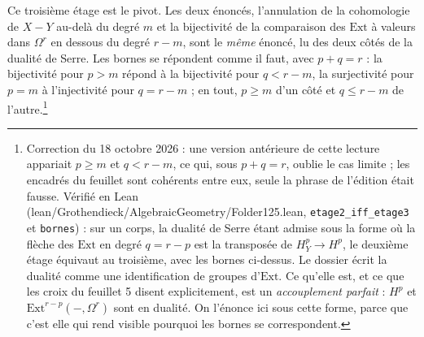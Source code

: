 \documentclass[11pt,a4paper]{article}
\begin{document}
Ce troisième étage est le pivot. Les deux énoncés, l'annulation de la
cohomologie de $X - Y$ au-delà du degré $m$ et la bijectivité de la
comparaison des $\mathrm{Ext}$ à valeurs dans $\Omega^{r}$ en dessous du degré
$r - m$, sont le \emph{même}
énoncé, lu des deux côtés de la dualité de Serre. Les bornes se répondent
comme il faut, avec $p + q = r$ : la bijectivité pour $p > m$ répond à la
bijectivité pour $q < r - m$, la surjectivité pour $p = m$ à l'injectivité
pour $q = r - m$ ; en tout, $p \geqslant m$ d'un côté et $q \leqslant r - m$
de l'autre.\footnote{Correction du 18 octobre 2026 : une version antérieure de
cette lecture appariait $p \geqslant m$ et $q < r - m$, ce qui, sous
$p + q = r$, oublie le cas limite ; les encadrés du feuillet sont cohérents
entre eux, seule la phrase de l'édition était fausse. Vérifié en Lean
(lean/Grothendieck/AlgebraicGeometry/Folder125.lean, \texttt{etage2\_iff\_etage3} et
\texttt{bornes}) : sur un corps, la dualité de Serre étant admise sous la forme
où la flèche des $\mathrm{Ext}$ en degré $q = r - p$ est la transposée de
$H^{p}_{Y} \to H^{p}$, le deuxième étage équivaut au troisième, avec les
bornes ci-dessus. Le dossier écrit la dualité comme une identification de
groupes d'$\mathrm{Ext}$. Ce qu'elle est, et ce que les croix du feuillet 5
disent explicitement, est un \emph{accouplement parfait} : $H^{p}$ et
$\mathrm{Ext}^{r-p}(-, \Omega^{r})$ sont en dualité. On l'énonce ici sous
cette forme, parce que c'est elle qui rend visible pourquoi les bornes se
correspondent.}
\end{document}
